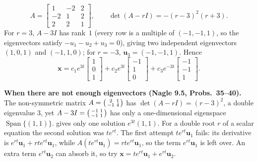 \documentclass[10pt]{scrartcl}
\newcommand{\vv}[1]{\mathbf{#1}}
\DeclareMathOperator{\spn}{Span}
\begin{document}
\begin{example*}
  \[
    A = \begin{bmatrix}1&-2&2\\-2&1&2\\2&2&1\end{bmatrix}, \qquad \det(A-rI)=-(r-3)^2(r+3).
  \]
  For $r=3$, $A-3I$ has rank~$1$ (every row is a multiple of $(-1,-1,1)$, so the eigenvectors satisfy $-u_1-u_2+u_3=0$), giving two independent eigenvectors $(1,0,1)$ and $(-1,1,0)$; for $r=-3$, $\vv u_3=(-1,-1,1)$. Hence
  \[
    \vv x=c_1e^{3t}\begin{bmatrix}1\\0\\1\end{bmatrix}+c_2e^{3t}\begin{bmatrix}-1\\1\\0\end{bmatrix}+c_3e^{-3t}\begin{bmatrix}-1\\-1\\1\end{bmatrix}.
  \]
\end{example*}

\noindent\textbf{When there are not enough eigenvectors (Nagle 9.5, Probs.~35--40).} The non-symmetric matrix $A=\begin{psmallmatrix}2&1\\-1&4\end{psmallmatrix}$ has $\det(A-rI)=(r-3)^2$, a double eigenvalue $3$, yet $A-3I=\begin{psmallmatrix}-1&1\\-1&1\end{psmallmatrix}$ has only a one-dimensional eigenspace $\spn\{(1,1)\}$.  gives only one solution $e^{3t}(1,1)$. For a double root $r$ of a scalar equation the second solution was $te^{rt}$. The first attempt $te^{rt}\vv u_1$ fails: its derivative is $e^{rt}\vv u_1+rte^{rt}\vv u_1$, while $A(te^{rt}\vv u_1)=rte^{rt}\vv u_1$, so the term $e^{rt}\vv u_1$ is left over. An extra term $e^{rt}\vv u_2$ can absorb it, so try $\vv x=te^{rt}\vv u_1+e^{rt}\vv u_2$.
\end{document}
